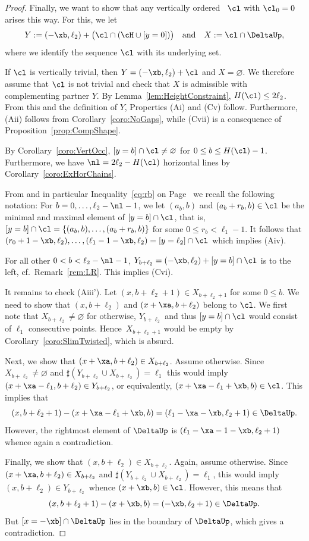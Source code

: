 \begin{proof}
Finally, we want to show that any vertically
ordered {\mes}~$\cl$ with $\cl_0=0$ arises 
this way. For this, we let
$$
Y:=(-\xb,\ell_2)+\big(\cl\cap(\cH\cup[y=0])\big)
\quad\mbox{and}\quad X:=\cl\cap\DeltaUp,
$$ 
where we identify the sequence $\cl$ with its
underlying set. 

If $\cl$ is vertically trivial, 
then $Y=(-\xb,\ell_2)+\cl$ and $X=\varnothing$. 
We therefore assume that $\cl$ is not trivial
and check that $X$ is admissible with complementing
partner $Y$. By Lemma~\ref{lem:HeightConstraint},
$H(\cl)\leq2\ell_2$. From this and the definition 
of $Y$, Properties (Ai) and (Cv) follow. Furthermore, 
(Aii) follows from Corollary~\ref{coro:NoGaps}, while 
(Cvii) is a consequence of Proposition~\ref{prop:CompShape}.

By Corollary~\ref{coro:VertOcc}, $[y=b]\cap\cl\not=
\varnothing$ for $0\leq b\leq H(\cl)-1$. Furthermore,
we have $\nl=2\ell_2-H(\cl)$ horizontal lines by 
Corollary~\ref{coro:ExHorChains}. 

{From  and in particular 
Inequality~\eqref{eq:rb} on Page~\pageref{eq:rb} we recall 
the following notation:} For $b=0,\ldots,
\ell_2-\nl -1$, we let $(a_b,b)$ and $(a_b+r_b,b)\in\cl$ 
be the minimal and maximal element of $[y=b]\cap\cl$,
that is, \mbox{$[y=b]\cap\cl=\{(a_b,b),\ldots,(a_b+r_b,b)\}$} for some $0\leq r_b<\ell_1-1$. {It follows that} $(r_0+1-\xb,\ell_2),\ldots,(\ell_1-1-\xb,\ell_2)
=[y=\ell_2]\cap\cl$ which implies (Aiv). 

For all other $0<b<\ell_2-\nl -1$, 
$Y_{b+\ell_2}=(-\xb,\ell_2)+[y=b]\cap\cl$ is to the 
left, cf.\ Remark~\ref{rem:LR}. This implies (Cvi).

It remains to check (Aiii'). Let $(x,b+\ell_2+1)\in 
X_{b+\ell_2+1}$ for some $0\leq b$. We need to show 
that $(x,b+\ell_2)$ and $(x+\xa,b+\ell_2)$ belong to 
$\cl$. We first note that $X_{b+\ell_2}\neq\varnothing$ 
for otherwise, $Y_{b+\ell_2}$ and thus
$[y=b]\cap\cl$ would consist of $\ell_1$ 
consecutive points. Hence~$X_{b+\ell_2+1}$ 
would be empty by Corollary~\ref{coro:SlimTwisted}, 
which is absurd.

Next, we show that $(x+\xa,b+\ell_2)\in X_{b+\ell_2}$. 
Assume otherwise. Since $X_{b+\ell_2}\neq\varnothing$ 
and $\sharp(Y_{b+\ell_2}\cup X_{b+\ell_2})=\ell_1$ 
this would imply $(x+\xa-\ell_1,b+\ell_2)\in Y_{b+\ell_2}$, 
or equivalently, $(x+\xa-\ell_1+\xb,b)\in\cl$. {This implies 
that}
$$
(x,b+\ell_2+1)-(x+\xa-\ell_1+\xb,b)=
(\ell_1-\xa-\xb,\ell_2+1)\in\DeltaUp.
$$
However, the rightmost element of $\DeltaUp$ is 
$(\ell_1-\xa-1-\xb,\ell_2+1)$ whence again 
a contradiction.

Finally, we show that $(x,b+\ell_2)\in X_{b+\ell_2}$.
Again, assume otherwise. Since \mbox{$(x+\xa,b+\ell_2)\in X_{b+\ell_2}$}
and $\sharp(Y_{b+\ell_2}\cup X_{b+\ell_2})=\ell_1$, 
this would imply $(x,b+\ell_2)\in Y_{b+\ell_2}$ 
whence $(x+\xb, b)\in\cl$.
However, this means that
$$
(x,b+\ell_2+1)-(x+\xb,b)=(-\xb,\ell_2+1)\in\DeltaUp.
$$
But $[x=-\xb]\cap\DeltaUp$ lies in the boundary of
$\DeltaUp$, which gives a contradiction.
\end{proof}

